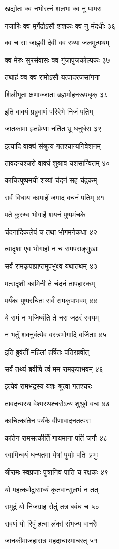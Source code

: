 खद्योतः क्व नभोरत्नं शलभः क्व नु पामरः

गजारिः क्व मृगेंद्रोऽसौ शशकः क्व नु मंदधीः ३६

क्व च सा जाह्नवी देवी क्व रथ्या जलमुत्पथम्

क्व मेरुः सुरसंवासः क्व गुंजापुंजकोल्पकः ३७

तथाहं क्व क्व रामोऽसौ यत्पादरजसांगना

शिलीभूता क्षणाज्जाता ब्रह्ममोहनरूपधृक् ३८

इति वाक्यं प्रब्रुवाणं परिरेभे निजं पतिम्

जातकामा हृतप्रेम्णा नर्तित भ्रू धनुर्धरा ३९

इत्यादि वाक्यं संश्रुत्य गतश्चान्यनिवेशनम्

तावदन्यश्चरो वाक्यं शुश्राव यशसान्वितम् ४०

काचित्पुष्पमयीं शय्यां चंदनं सह चंद्रकम्

सर्वं विधाय कामार्हं जगाद वचनं पतिम् ४१

पते कुरुष्व भोगार्हे शयनं पुष्पमंचके

चंदनादिकलेपं च तथा भोगमनेकधा ४२

त्वादृशा एव भोगार्हा न च रामपराङ्मुखाः

सर्वं रामकृपाप्राप्तमुपभुंक्ष्व यथातथम् ४३

मत्सदृशी कामिनी ते चंदनं तापहारकम्

पर्यंकः पुष्परचितः सर्वं रामकृपाभवम् ४४

ये रामं न भजिष्यंति ते नरा जठरं स्वयम्

न भर्तुं शक्नुवंत्येव वस्त्रभोगादि वर्जिताः ४५

इति ब्रुवंतीं महिलां हर्षितः पतिरब्रवीत्

सर्वं तथ्यं ब्रवीषि त्वं मम रामकृपाभवम् ४६

इत्येवं रामभद्रस्य यशः श्रुत्वा गतश्चरः

तावदन्यस्य वेश्मस्थश्चरोऽन्य शुश्रुवे वचः ४७

काचित्कांतेन पर्यंके वीणावादनतत्परा

कांतेन रामसत्कीर्तिं गायमाना पतिं जगौ ४८

स्वामिन्वयं धन्यतमा येषां पुर्याः पतिः प्रभुः

श्रीरामः स्वप्रजाः पुत्रानिव पाति च रक्षकः ४९

यो महत्कर्मदुःसाध्यं कृतवान्सुलभं न तत्

समुद्रं यो निजग्राह सेतुं तत्र बबंध च ५०

रावणं यो रिपुं हत्वा लंकां संभज्य वानरैः

जानकीमाजहारात्र महदाचारमाचरत् ५१

